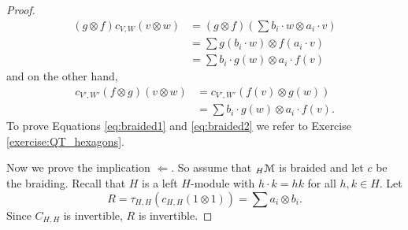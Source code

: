 \begin{proof}
\begin{align*}
(g\otimes f)c_{V,W}(v\otimes w) & =(g\otimes f)\left(\sum b_{i}\cdot w\otimes a_{i}\cdot v\right)\\
 & =\sum g(b_{i}\cdot w)\otimes f(a_{i}\cdot v)\\
 & =\sum b_{i}\cdot g(w)\otimes a_{i}\cdot f(v)
\end{align*}
and on the other hand,
\begin{align*}
c_{V',W'}(f\otimes g)(v\otimes w) & =c_{V',W'}(f(v)\otimes g(w))\\
 & =\sum b_{i}\cdot g(w)\otimes a_{i}\cdot f(v).
\end{align*}
To prove Equations \eqref{eq:braided1} and \eqref{eq:braided2} we refer to
Exercise \eqref{exercise:QT_hexagons}.

Now we prove the implication $\Longleftarrow$. So assume that ${}_{H}\mathcal{M}$ is
braided and let $c$ be the braiding. Recall that $H$ is a left $H$-module with
$h\cdot k=hk$ for all $h,k\in H$.  Let  
\[
R=\tau_{H,H}(c_{H,H}(1\otimes1))=\sum a_{i}\otimes b_{i}.
\]
Since $C_{H,H}$ is invertible, $R$ is invertible. 


\end{proof}

